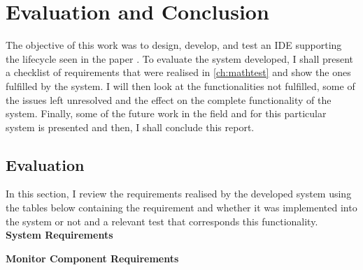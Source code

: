 \chapter{Evaluation and Conclusion}\label{ch:conclusions}
The objective of this work was to design, develop, and test an IDE supporting the lifecycle seen in the paper \cite{andrikopoulos2017engineering}. To evaluate the system developed, I shall present a checklist of requirements that were realised in \autoref{ch:mathtest} and show the ones fulfilled by the system. I will then look at the functionalities not fulfilled, some of the issues left unresolved and the effect on the complete functionality of the system. Finally, some of the future work in the field and for this particular system is presented and then, I shall conclude this report.
\section{Evaluation}
In this section, I review the requirements realised by the developed system using the tables below containing the requirement and whether it was implemented into the system or not and a relevant test that corresponds this functionality.\\
\textbf{System Requirements}
\begin{table}[H]
\caption{System Functional Requirements evaluation}
\label{my-label1}
\end{table}

\textbf{Monitor Component Requirements}
\begin{table}[H]
\caption{Monitor Component Functional Requirements evaluation}
\label{my-label2}
\end{table}

